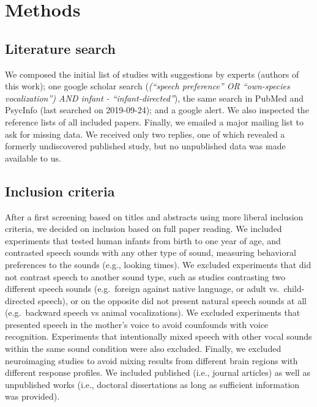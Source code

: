 \documentclass[man]{apa6}
\begin{document}
\section{Methods}\label{methods}

\subsection{Literature search}\label{literature-search}

We composed the initial list of studies with suggestions by experts
(authors of this work); one google scholar search
(\emph{(\enquote{speech preference} OR \enquote{own-species
vocalization}) AND infant - \enquote{infant-directed}}), the same search
in PubMed and PsycInfo (last searched on 2019-09-24); and a google
alert. We also inspected the reference lists of all included papers.
Finally, we emailed a major mailing list to ask for missing data. We
received only two replies, one of which revealed a formerly undiscovered
published study, but no unpublished data was made available to us.

\subsection{Inclusion criteria}\label{inclusion-criteria}

After a first screening based on titles and abstracts using more liberal
inclusion criteria, we decided on inclusion based on full paper reading.
We included experiments that tested human infants from birth to one year
of age, and contrasted speech sounds with any other type of sound,
measuring behavioral preferences to the sounds (e.g., looking times). We
excluded experiments that did not contrast speech to another sound type,
such as studies contrasting two different speech sounds (e.g.~foreign
against native language, or adult vs.~child-directed speech), or on the
opposite did not present natural speech sounds at all (e.g.~backward
speech vs animal vocalizations). We excluded experiments that presented
speech in the mother's voice to avoid counfounds with voice recognition.
Experiments that intentionally mixed speech with other vocal sounds
within the same sound condition were also excluded. Finally, we excluded
neuroimaging studies to avoid mixing results from different brain
regions with different response profiles. We included published (i.e.,
journal articles) as well as unpublished works (i.e., doctoral
dissertations as long as sufficient information was provided).
\end{document}
